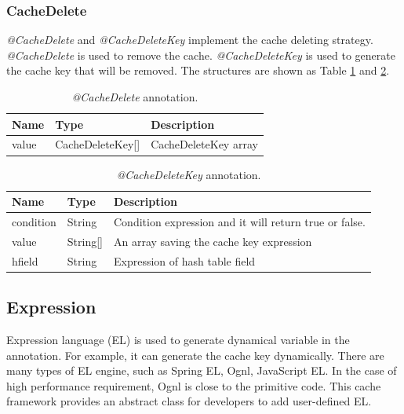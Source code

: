 \documentclass{singlecol-new}
\theoremstyle{TH}{
\newtheorem{lemma}{Lemma}
\newtheorem{theorem}[lemma]{Theorem}
\newtheorem{corrolary}[lemma]{Corrolary}
\newtheorem{conjecture}[lemma]{Conjecture}
\newtheorem{proposition}[lemma]{Proposition}
\newtheorem{claim}[lemma]{Claim}
\newtheorem{stheorem}[lemma]{Wrong Theorem}
}
\theoremstyle{THrm}{
\newtheorem{definition}{Definition}[section]
\newtheorem{question}{Question}[section]
\newtheorem{remark}{Remark}
\newtheorem{scheme}{Scheme}
}
\theoremstyle{THhit}{
\newtheorem{case}{Case}[section]
}
\begin{document}
\subsubsection{CacheDelete}
\textit{@CacheDelete} and \textit{@CacheDeleteKey} implement the cache deleting strategy. \textit{@CacheDelete} is used to remove the cache. \textit{@CacheDeleteKey} is used to generate the cache key that will be removed. The structures are shown as Table \ref{CacheDelete} and \ref{CacheDeleteKey}.

\begin{table}[htb]
\begin{center}
 \caption{\label{CacheDelete}\textit{@CacheDelete} annotation.}
 \begin{tabular}{lll}
 \toprule
\textbf{Name} & \textbf{Type} & \textbf{Description}\\
 \midrule
value & CacheDeleteKey[] & CacheDeleteKey array\\
\bottomrule
 \end{tabular}
\end{center}
\end{table}

\begin{table}[htb]
\begin{center}
 \caption{\label{CacheDeleteKey}\textit{@CacheDeleteKey} annotation.}
 \begin{tabular}{lll}
 \toprule
\textbf{Name} & \textbf{Type} & \textbf{Description}\\
 \midrule
condition & String & Condition expression and it will return true or false.\\ %
value & String[] & An array saving the cache key expression\\
hfield & String & Expression of hash table field\\
\bottomrule
 \end{tabular}
\end{center}
\end{table}

\subsection{Expression}
Expression language (EL) is used to generate dynamical variable in the annotation. For example, it can generate the cache key dynamically. There are many types of EL engine, such as Spring EL, Ognl, JavaScript EL. In the case of high performance requirement, Ognl is close to the primitive code. This cache framework provides an abstract class for developers to add user-defined EL.
\end{document}
